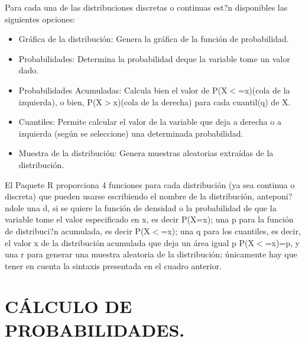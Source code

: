 \documentclass[12pt,letterpaper]{article}\usepackage[]{graphicx}\usepackage[]{color}
\begin{document}
Para cada una de las distribuciones discretas o continuas est?n disponibles las siguientes opciones:
\begin{itemize}
\item Gr\'afica de la distribuci\'on: Genera la gr\'afica de la funci\'on de probabilidad.
\item Probabilidades: Determina la probabilidad deque la variable tome un valor dado. 
\item Probabilidades Acumuladas: Calcula bien el valor de P(X$<$=x)(cola de la izquierda), o bien, P(X$>$x)(cola de la derecha) para cada cuantil(q) de X.
\item Cuantiles: Permite calcular el valor de la variable que deja a derecha o a izquierda (seg\'un se seleccione) una determinada probabilidad. 
\item Muestra de la distribuci\'on: Genera muestras aleatorias extra\'idas de la distribuci\'on. 
\end{itemize}

El Paquete R proporciona 4 funciones para cada distribuci\'on (ya sea continua o discreta) que pueden usarse escribiendo el nombre de la distribuci\'on, anteponi?ndole una d, si se quiere la funci\'on de densidad o la probabilidad de que la variable tome el valor especificado en x, es decir P(X=x); una p para la funci\'on de distribuci?n acumulada, es decir P(X$<$=x); una q para los cuantiles, es decir, el valor x de la distribuci\'on acumulada que deja un \'area igual p P(X$<$=x)=p, y una r para generar una muestra aleatoria de la distribuci\'on; \'unicamente hay que tener en cuenta la sintaxis presentada en el cuadro anterior.


\section{C\'ALCULO DE PROBABILIDADES.}
\end{document}
